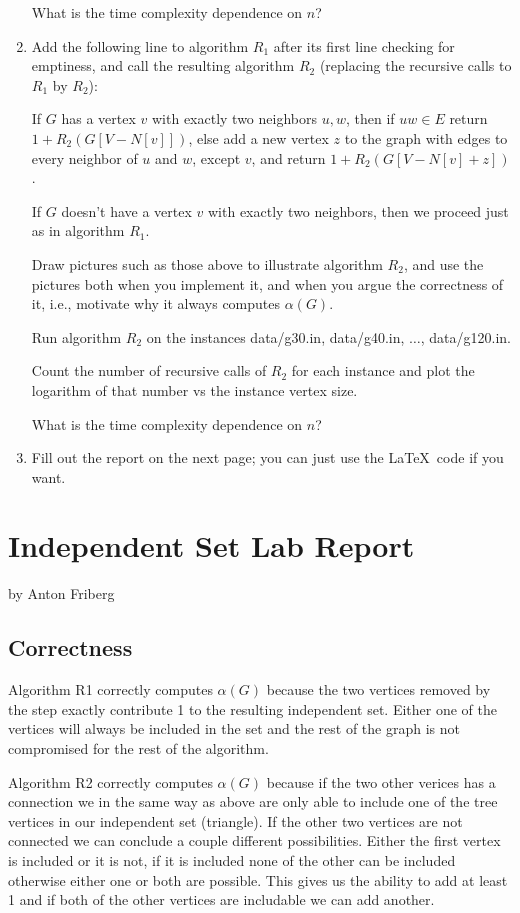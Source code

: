 \documentclass{tufte-handout}
\begin{document}
\begin{enumerate}
  What is the time complexity dependence on $n$?

\item Add the following line to algorithm $R_1$ after its first line
  checking for emptiness, and call the resulting algorithm $R_2$
  (replacing the recursive calls to $R_1$ by $R_2$):
 
  If $G$ has a vertex $v$ with exactly two neighbors $u,w$, then if
  $uw\in E$ return $1+R_2(G[V-N[v]])$, else add a new vertex $z$ to
  the graph with edges to every neighbor of $u$ and $w$, except $v$,
  and return $1+R_2(G[V-N[v]+z])$.

  If $G$ doesn't have a vertex $v$ with exactly two neighbors, then we
  proceed just as in algorithm $R_1$.
 
  Draw pictures such as those above to illustrate algorithm $R_2$, and
  use the pictures both when you implement it, and when you argue the
  correctness of it, i.e., motivate why it always computes
  $\alpha(G)$.
 
  Run algorithm $R_2$ on the instances data/g30.in, data/g40.in,
  $\ldots$, data/g120.in.

  Count the number of recursive calls of $R_2$ for each instance and plot the
  logarithm of that number vs the instance vertex size. 
  
  What is the time complexity dependence on $n$?

\item Fill out the report on the next page; you can just use the
  \LaTeX\ code if you want.
\end{enumerate}

\newpage


\newpage
\section{Independent Set Lab Report}


by Anton Friberg

\subsection{Correctness}
Algorithm R1 correctly computes $\alpha(G)$ because the two vertices removed by the step exactly contribute 1 to the
resulting independent set. Either one of the vertices will always be included in the set and the rest of the graph is
not compromised for the rest of the algorithm.

\noindent
Algorithm R2 correctly computes $\alpha(G)$ because if the two other verices has a connection we in the same way as
above are only able to include one of the tree vertices in our independent set (triangle). If the other two vertices are
not connected we can conclude a couple different possibilities. Either the first vertex is included or it is not, if it
is included none of the other can be included otherwise either one or both are possible. This gives us the ability to
add at least 1 and if both of the other vertices are includable we can add another.
\end{document}

